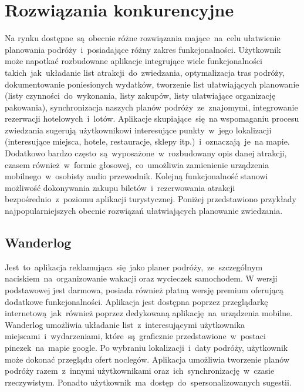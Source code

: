 \section{Rozwiązania konkurencyjne}
\label{sec:rozwiazania-konkurencyjne}
Na rynku dostępne~są~obecnie różne rozwiązania mające~na~celu ułatwienie planowania podróży~i~posiadające różny zakres funkcjonalności.
Użytkownik może napotkać rozbudowane aplikacje integrujące wiele funkcjonalności takich~jak~układanie list atrakcji~do~zwiedzania, optymalizacja tras podróży, dokumentowanie poniesionych wydatków, tworzenie list ułatwiających planowanie (listy czynności~do~wykonania, listy zakupów, listy ułatwiające organizację pakowania), synchronizacja naszych planów podróży~ze~znajomymi, integrowanie rezerwacji hotelowych~i~lotów.
Aplikacje skupiające~się~na wspomaganiu procesu zwiedzania sugerują użytkownikowi interesujące punkty~w~jego lokalizacji (interesujące miejsca, hotele, restauracje, sklepy itp.)~i~oznaczają~je~na mapie.
Dodatkowo bardzo często~są~wyposażone~w~rozbudowany opis danej atrakcji, czasem również~w~formie głosowej,~co~umożliwia zamienienie urządzenia mobilnego~w~osobisty audio przewodnik.
Kolejną funkcjonalność stanowi możliwość dokonywania zakupu biletów~i~rezerwowania atrakcji bezpośrednio~z~poziomu aplikacji turystycznej.
Poniżej przedstawiono przykłady najpopularniejszych obecnie rozwiązań ułatwiających planowanie zwiedzania.

\subsection{Wanderlog}
\label{subsec:wanderlog}
Jest~to~aplikacja reklamująca~się~jako planer podróży,~ze~szczególnym naciskiem~na~organizowanie wakacji oraz wycieczek samochodem.
W wersji podstawowej jest darmowa, posiada również płatną wersję premium  oferującą dodatkowe funkcjonalności.
Aplikacja jest dostępna poprzez przeglądarkę internetową~jak~również poprzez dedykowaną aplikację~na~urządzenia mobilne.
Wanderlog umożliwia układanie list~z~interesującymi użytkownika miejscami~i~wydarzeniami, które~są~graficznie przedstawione~w~postaci pinezek~na~mapie google.
Po wybraniu lokalizacji~i~daty podróży, użytkownik może dokonać przeglądu ofert noclegów.
Aplikacja umożliwia tworzenie planów podróży razem~z~innymi użytkownikami oraz~ich~synchronizację~w~czasie rzeczywistym.
Ponadto użytkownik~ma~dostęp~do~spersonalizowanych sugestii.

